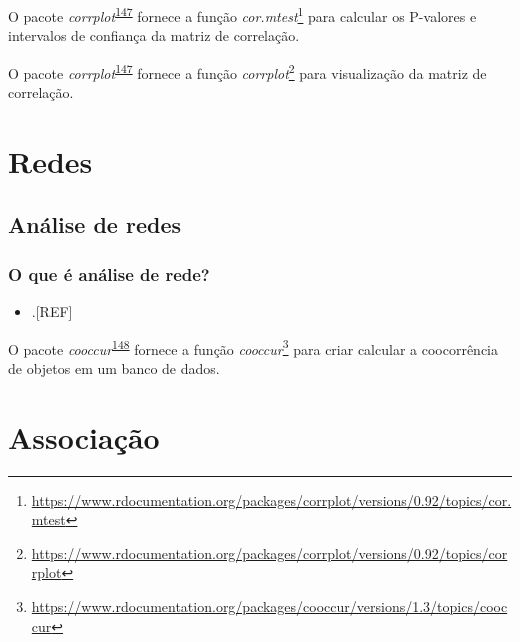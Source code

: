 \documentclass[
  a4paper,
]{book}
\providecommand{\tightlist}{%
  \setlength{\itemsep}{0pt}\setlength{\parskip}{0pt}}
\renewcommand{\href}[2]{#2\footnote{\url{#1}}}
\newenvironment{infobox}[1]
  {
  \begin{itemize}
  \renewcommand{\labelitemi}{
    \raisebox{-.7\height}[0pt][0pt]{
      {\setkeys{Gin}{width=3em,keepaspectratio}
        \texttt{[image: \#1]}}
    }
  }
  \setlength{\fboxsep}{1em}
  \begin{blackbox}
  \item
  }
  {
  \end{blackbox}
  \end{itemize}
  }
\begin{document}
\begin{infobox}{images/Rlogo}
O pacote \emph{corrplot}\textsuperscript{\protect\hyperlink{ref-corrplot-2}{147}} fornece a função \href{https://www.rdocumentation.org/packages/corrplot/versions/0.92/topics/cor.mtest}{\emph{cor.mtest}} para calcular os P-valores e intervalos de confiança da matriz de correlação.

\end{infobox}

\begin{infobox}{images/Rlogo}
O pacote \emph{corrplot}\textsuperscript{\protect\hyperlink{ref-corrplot-2}{147}} fornece a função \href{https://www.rdocumentation.org/packages/corrplot/versions/0.92/topics/corrplot}{\emph{corrplot}} para visualização da matriz de correlação.

\end{infobox}

\hypertarget{analise-redes}{%
\chapter{\texorpdfstring{\textbf{Redes}}{Redes}}\label{analise-redes}}

\hypertarget{redes}{%
\section{Análise de redes}\label{redes}}

\hypertarget{o-que-uxe9-anuxe1lise-de-rede}{%
\subsection{O que é análise de rede?}\label{o-que-uxe9-anuxe1lise-de-rede}}

\begin{itemize}
\tightlist
\item
  .{[}REF{]}
\end{itemize}

\begin{infobox}{images/Rlogo}
O pacote \emph{cooccur}\textsuperscript{\protect\hyperlink{ref-cooccur}{148}} fornece a função \href{https://www.rdocumentation.org/packages/cooccur/versions/1.3/topics/cooccur}{\emph{cooccur}} para criar calcular a coocorrência de objetos em um banco de dados.

\end{infobox}

\hypertarget{analise-inferencial-associacao}{%
\chapter{\texorpdfstring{\textbf{Associação}}{Associação}}\label{analise-inferencial-associacao}}
\end{document}
